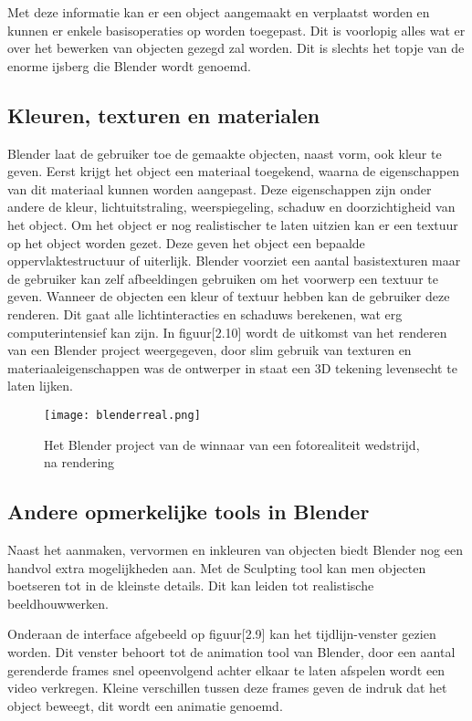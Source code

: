 \par
Met deze informatie kan er een object aangemaakt en verplaatst worden en kunnen er enkele basisoperaties op worden toegepast. Dit is voorlopig alles wat er over het bewerken van objecten gezegd zal worden. Dit is slechts het topje van de enorme ijsberg die Blender wordt genoemd.


\subsection{Kleuren, texturen en materialen}
Blender laat de gebruiker toe de gemaakte objecten, naast vorm, ook kleur te geven. Eerst krijgt het object een materiaal toegekend, waarna de eigenschappen van dit materiaal kunnen worden aangepast. Deze eigenschappen zijn onder andere de kleur, lichtuitstraling, weerspiegeling, schaduw en doorzichtigheid van het object. Om het object er nog realistischer te laten uitzien kan er een textuur op het object worden gezet. Deze geven het object een bepaalde oppervlaktestructuur of uiterlijk. Blender voorziet een aantal basistexturen maar de gebruiker kan zelf afbeeldingen gebruiken om het voorwerp een textuur te geven. Wanneer de objecten een kleur of textuur hebben kan de gebruiker deze renderen. Dit gaat alle lichtinteracties en schaduws berekenen, wat erg computerintensief kan zijn. In figuur[2.10] wordt de uitkomst van het renderen van een Blender project weergegeven, door slim gebruik van texturen en materiaaleigenschappen was de ontwerper in staat een 3D tekening levensecht te laten lijken. \citep*{BLEN2}

\begin{figure}[h]
\texttt{[image: blenderreal.png]}
\caption{Het Blender project van de winnaar van een fotorealiteit wedstrijd, na rendering}
\end{figure}

\subsection{Andere opmerkelijke tools in Blender}
Naast het aanmaken, vervormen en inkleuren van objecten biedt Blender nog een handvol extra mogelijkheden aan. Met de Sculpting tool kan men objecten boetseren tot in de kleinste details. Dit kan leiden tot realistische beeldhouwwerken.

\par 
Onderaan de interface afgebeeld op figuur[2.9] kan het tijdlijn-venster gezien worden. Dit venster behoort tot de animation tool van Blender, door een aantal gerenderde frames snel opeenvolgend achter elkaar te laten afspelen wordt een video verkregen. Kleine verschillen tussen deze frames geven de indruk dat het object beweegt, dit wordt een animatie genoemd. 

